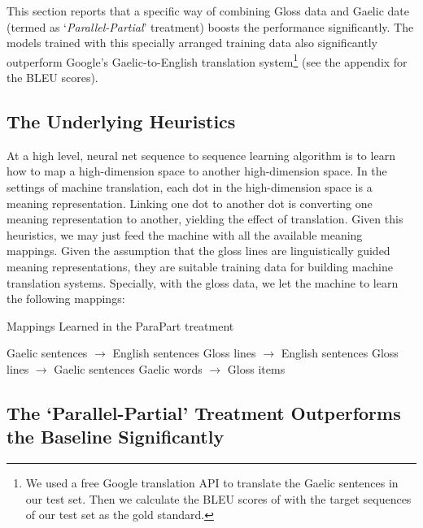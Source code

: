 \documentclass[a4paper]{article}
\begin{document}
This section reports that a specific way of combining Gloss data and Gaelic date (termed as `\textit{Parallel-Partial}' treatment) boosts the performance significantly. The models trained with this specially arranged training data also significantly outperform Google's Gaelic-to-English translation system\footnote{ We used a free Google translation API \citep{google_api} to translate the Gaelic sentences in our test set. Then we calculate the BLEU scores of with the target sequences of our test set as the gold standard.} (see the appendix for the BLEU scores).

\subsection{The Underlying Heuristics}\label{heuristics}
At a high level, neural net sequence to sequence learning algorithm is to learn how to map a high-dimension space to another high-dimension space. In the settings of machine translation, each dot in the high-dimension space is a meaning representation. Linking one dot to another dot is converting one meaning representation to another, yielding the effect of translation. Given this heuristics, we may just feed the machine with all the available meaning mappings. Given the assumption that the gloss lines are linguistically guided meaning representations, they are suitable training data for building machine translation systems. Specially, with the gloss data, we let the machine to learn the following mappings:

\begin{exe}
	\ex Mappings Learned in the ParaPart treatment
	\begin{xlist}
		\ex Gaelic sentences $\rightarrow$ English sentences
		\ex Gloss lines $\rightarrow$ English sentences
		\ex Gloss lines $\rightarrow$ Gaelic sentences
		\ex Gaelic words $\rightarrow$ Gloss items
	\end{xlist}	
\end{exe}    

\subsection{The `Parallel-Partial' Treatment Outperforms the Baseline Significantly}\label{sec:ParaPart}
\end{document}
